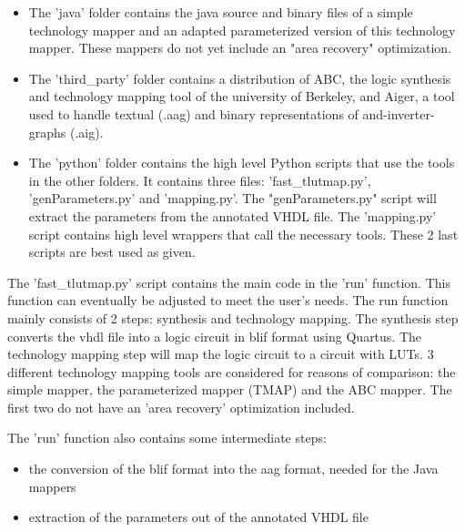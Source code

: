 \documentclass[a4paper]{memoir}
\begin{document}
\begin{itemize}
\item The 'java' folder contains the java source and binary files of a simple technology mapper and an adapted parameterized version of this technology mapper. These mappers do not yet include an "area recovery" optimization.
\item The 'third\_party' folder contains a distribution of ABC, the logic synthesis and technology mapping tool of the university of Berkeley, and Aiger, a tool used to handle textual (.aag) and binary representations of and-inverter-graphs (.aig).    
\item The 'python' folder contains the high level Python scripts that use the tools in the other folders. It contains three files: 'fast\_tlutmap.py', 'genParameters.py' and 'mapping.py'. The "genParameters.py" script will extract the parameters from the annotated VHDL file. The 'mapping.py' script contains high level wrappers that call the necessary tools. These 2 last scripts are best used as given. 
\end{itemize}

The 'fast\_tlutmap.py' script contains the main code in the 'run' function. This function can eventually be adjusted to meet the user's needs. The run function mainly consists of 2 steps: synthesis and technology mapping. The synthesis step converts the vhdl file into a logic circuit in blif format using Quartus. The technology mapping step will map the logic circuit to a circuit with LUTs. 3 different technology mapping tools are considered for reasons of comparison: the simple mapper, the parameterized mapper (TMAP) and the ABC mapper. The first two do not have an 'area recovery' optimization included. 

The 'run' function also contains some intermediate steps:
\begin{itemize} 
\item the conversion of the blif format into the aag format, needed for the Java mappers
\item extraction of the parameters out of the annotated VHDL file
\end{itemize}

\end{document}
